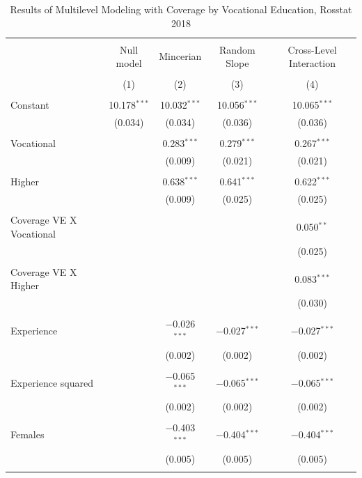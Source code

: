 \documentclass[12pt,a4paper]{article}
\numberwithin{equation}{section}
\begin{document}
\begin{table}[!htbp] \centering 
	\caption{Results of Multilevel Modeling with Coverage by Vocational Education, Rosstat 2018} 
	\label{tab:A2} 
	\begin{tabular}{@{\extracolsep{5pt}}lcccc} 
		\\[-1.8ex]\hline 
		\hline \\[-1.8ex] 
		& Null model & Mincerian & Random Slope & Cross-Level Interaction \\ 
		\\[-1.8ex] & (1) & (2) & (3) & (4)\\ 
		\hline \\[-1.8ex] 
		Constant & 10.178$^{***}$ & 10.032$^{***}$ & 10.056$^{***}$ & 10.065$^{***}$ \\ 
		& (0.034) & (0.034) & (0.036) & (0.036) \\ 
		& & & & \\ 
		Vocational &  & 0.283$^{***}$ & 0.279$^{***}$ & 0.267$^{***}$ \\ 
		&  & (0.009) & (0.021) & (0.021) \\ 
		& & & & \\ 
		Higher &  & 0.638$^{***}$ & 0.641$^{***}$ & 0.622$^{***}$ \\ 
		&  & (0.009) & (0.025) & (0.025) \\ 
		& & & & \\ 
		Coverage VE X Vocational &  &  &  & 0.050$^{**}$ \\ 
		&  &  &  & (0.025) \\ 
		& & & & \\ 
		Coverage VE X Higher &  &  &  & 0.083$^{***}$ \\ 
		&  &  &  & (0.030) \\ 
		& & & & \\ 
		Experience &  & $-$0.026$^{***}$ & $-$0.027$^{***}$ & $-$0.027$^{***}$ \\ 
		&  & (0.002) & (0.002) & (0.002) \\ 
		& & & & \\ 
		Experience squared &  & $-$0.065$^{***}$ & $-$0.065$^{***}$ & $-$0.065$^{***}$ \\ 
		&  & (0.002) & (0.002) & (0.002) \\ 
		& & & & \\ 
		Females &  & $-$0.403$^{***}$ & $-$0.404$^{***}$ & $-$0.404$^{***}$ \\ 
		&  & (0.005) & (0.005) & (0.005) \\ 
		& & & & \\ 

\end{tabular}
\end{table}
\end{document}
